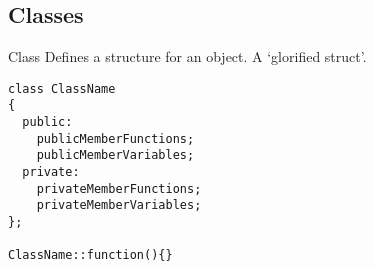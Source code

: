 \documentclass[\main/notes.tex]{subfiles}
\begin{document}
			\subsection*{Classes}
				\begin{definition}{Class}
					Defines a structure for an object. A `glorified struct'.
					\begin{verbatim}
class ClassName
{
  public:
    publicMemberFunctions;
    publicMemberVariables;
  private:
    privateMemberFunctions;
    privateMemberVariables;
};

ClassName::function(){}
					\end{verbatim}
				\end{definition}

\end{document}
